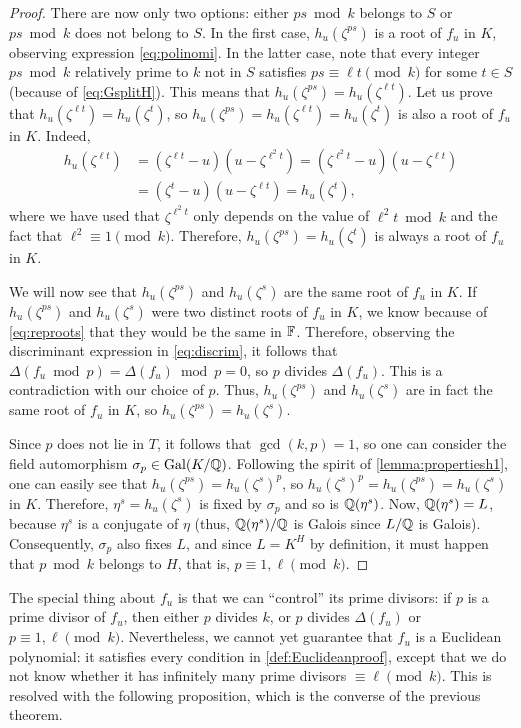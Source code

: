\documentclass[../main.tex]{subfiles}
\begin{document}
\begin{proof}
	  There are now only two options: either $ps \bmod{k}$ belongs to $S$ or $ps \bmod{k}$ does not belong to $S$. In the first case, $h_u(\zeta^{ps})$ is a root of $f_u$ in $K$, observing expression \cref{eq:polinomi}. In the latter case, note that every integer $ps \bmod{k}$ relatively prime to $k$ not in $S$ satisfies $ps\equiv \ell t\pmod{k}$ for some $t\in S$ (because of \cref{eq:GsplitH}). This means that $h_u(\zeta^{ps})=h_u(\zeta^{\ell t})$. Let us prove that $h_u(\zeta^{\ell t})=h_u(\zeta^{t})$, so $h_u(\zeta^{ps})=h_u(\zeta^{\ell t})=h_u(\zeta^{t})$ is also a root of $f_u$ in $K$. Indeed,
	  \begin{align*}
	  	h_u(\zeta^{\ell t})&=(\zeta^{\ell t}-u)(u-\zeta^{\ell^2t})=(\zeta^{\ell^2t}-u)(u-\zeta^{\ell t})\\
	  	&=(\zeta^{t}-u)(u-\zeta^{\ell t})=h_u(\zeta^{t}),
	  \end{align*}
	  where we have used that $\zeta^{\ell^2t}$ only depends on the value of $\ell^2t \bmod{k}$ and the fact that $\ell^2\equiv 1\pmod{k}$. Therefore, $h_u(\zeta^{ps})=h_u(\zeta^{t})$ is always a root of $f_u$ in $K$.
	  
	  We will now see that $h_u(\zeta^{ps})$ and $h_u(\zeta^{s})$ are the same root of $f_u$ in $K$. If $h_u(\zeta^{ps})$ and $h_u(\zeta^{s})$ were two distinct roots of $f_u$ in $K$, we know because of \cref{eq:reproots} that they would be the same in $\mathbb{F}$. Therefore, observing the discriminant expression in \cref{eq:discrim}, it follows that $\Delta(f_u \bmod{p})=\Delta(f_u) \bmod{p}=0$, so $p$ divides $\Delta(f_u)$. This is a contradiction with our choice of $p$. Thus, $h_u(\zeta^{ps})$ and $h_u(\zeta^{s})$ are in fact the same root of $f_u$ in $K$, so $h_u(\zeta^{ps})=h_u(\zeta^{s})$.
	  
	  Since $p$ does not lie in $T$, it follows that $\gcd(k,p)=1$, so one can consider the field automorphism $\sigma_p\in\operatorname{Gal}(K/\mathbb{Q})$. Following the spirit of \cref{lemma:propertiesh1}, one can easily see that $h_u(\zeta^{ps})=h_u(\zeta^s)^p$, so $h_u(\zeta^s)^p=h_u(\zeta^{ps})=h_u(\zeta^{s})$ in $K$. Therefore, $\eta^s=h_u(\zeta^{s})$ is fixed by $\sigma_p$ and so is $\mathbb{Q}(\eta^s)$. Now, $\mathbb{Q}(\eta^s)=L$, because $\eta^s$ is a conjugate of $\eta$ (thus, $\mathbb{Q}(\eta^s)/\mathbb{Q}$ is Galois since $L/\mathbb{Q}$ is Galois). Consequently, $\sigma_p$ also fixes $L$, and since  $L=K^H$ by definition, it must happen that $p \bmod{k}$ belongs to $H$, that is, $p\equiv 1,\ell \pmod{k}$.
\end{proof}

The special thing about $f_u$ is that we can ``control'' its prime divisors: if $p$ is a prime divisor of $f_u$, then either $p$ divides $k$, or $p$ divides $\Delta(f_u)$ or $p\equiv 1, \ell \pmod{k}$. Nevertheless, we cannot yet guarantee that $f_u$ is a Euclidean polynomial: it satisfies every condition in \cref{def:Euclideanproof}, except that we do not know whether it has infinitely many prime divisors $\equiv\ell\pmod{k}$. This is resolved with the following proposition, which is the converse of the previous theorem.
\end{document}
